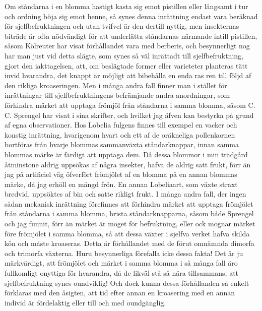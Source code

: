 Om ståndarna i en blomma hastigt kasta sig emot pistillen eller långsamt i tur och ordning böja sig emot henne, så synes denna inrättning endast vara beräknad för sjelfbefruktningen och utan tvifvel är den dertill nyttig, men insekternas biträde är ofta nödvändigt för att underlätta ståndarnas närmande intill pistillen, såsom Kölreuter har visat förhållandet vara med berberis, och besynnerligt nog har man just vid detta slägte, som synes så väl inrättadt till sjelfbefruktning, gjort den iakttagelsen, att, om beslägtade former eller varieteter planteras tätt invid hvarandra, det knappt är möjligt att bibehålla en enda ras ren till följd af den rikliga kroaseringen. Men i många andra fall finner man i stället för inrättningar till sjelfbefruktningens befrämjande andra anordningar, som förhindra märket att upptaga frömjöl från ståndarna i samma blomma, såsom C. C. Sprengel har visat i sina skrifter, och hvilket jag äfven kan bestyrka på grund af egna observationer. Hos Lobelia fulgens finnes till exempel en vacker och konstig inrättning, hvarigenom hvart och ett af de oräkneliga pollenkornen bortföras från hvarje blommas sammanväxta ståndarknappar, innan samma blommas märke är färdigt att upptaga dem. Då dessa blommor i min trädgård åtminstone aldrig uppsökas af några insekter, hafva de aldrig satt frukt, förr än jag på artificiel väg öfverfört frömjölet af en blomma på en annan blommas märke, då jag erhöll en mängd frön. En annan Lobeliaart, som växte straxt bredvid, uppsöktes af bin och satte rikligt frukt. I många andra fall, der ingen sådan mekanisk inrättning förefinnes att förhindra märket att upptaga frömjölet från ståndarna i samma blomma, brista ståndarknapparna, såsom både Sprengel och jag funnit, förr än märket är moget för befruktning, eller ock mognar märket före frömjölet i samma blomma, så att dessa växter i sjelfva verket hafva skilda kön och måste kroaseras. Detta är förhållandet med de förut omnämnda dimorfa och trimorfa växterna. Huru besynnerliga förefalla icke dessa fakta! Det är ju märkvärdigt, att frömjölet och märket i samma blomma i så många fall äro fullkomligt onyttiga för hvarandra, då de likväl stå så nära tillsammans, att sjelfbefruktning synes oundviklig! Och dock kunna dessa förhållanden så enkelt förklaras med den åsigten, att tid efter annan en kroasering med en annan individ är fördelaktig eller till och med oundgänglig.

